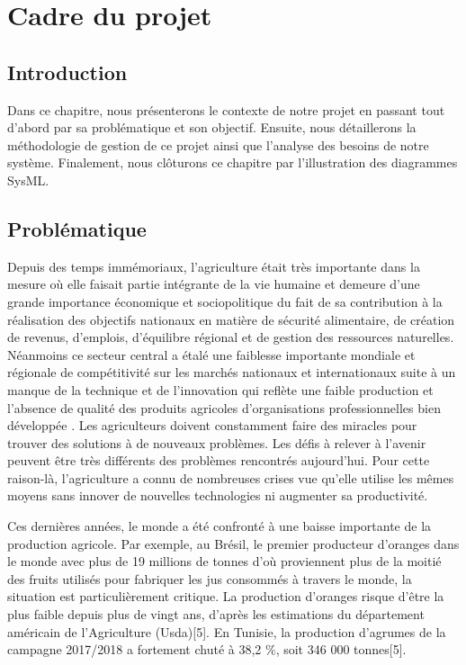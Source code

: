 

	\chapter{Cadre du projet }
	\newpage
	
	
	\section{Introduction }
	Dans ce chapitre, nous présenterons le contexte de notre projet en passant tout d'abord par sa  problématique et son objectif. Ensuite, nous détaillerons la méthodologie de gestion de ce projet ainsi que l'analyse des besoins de notre système. Finalement, nous clôturons ce chapitre par l'illustration des diagrammes SysML.
	
	\section{Problématique }
	Depuis des temps immémoriaux, l'agriculture était très importante dans la mesure où elle faisait partie intégrante de la vie humaine et demeure d'une grande importance économique et sociopolitique du fait de sa contribution à la réalisation des objectifs nationaux en matière de sécurité alimentaire, de création de revenus, d'emplois, d'équilibre régional et de gestion des ressources naturelles. Néanmoins ce secteur central a étalé une faiblesse importante mondiale et régionale de compétitivité sur les marchés nationaux et internationaux suite à un manque de la technique et de l'innovation qui reflète une faible production et l'absence de qualité des produits agricoles d'organisations professionnelles bien développée . Les agriculteurs doivent constamment faire des miracles pour trouver des solutions à de nouveaux problèmes. Les défis à relever à l'avenir peuvent être très différents des problèmes rencontrés aujourd'hui. Pour cette raison-là, l'agriculture a connu de nombreuses crises vue qu'elle utilise les mêmes moyens sans innover de nouvelles technologies ni augmenter sa productivité.
	
	Ces dernières années, le monde a été confronté à une baisse importante de la production agricole. Par exemple, au Brésil, le premier producteur d'oranges dans le monde avec plus de 19 millions de tonnes d'où proviennent plus de la moitié des fruits utilisés pour fabriquer les jus consommés à travers le monde, la situation est particulièrement critique. La production d'oranges risque d'être la plus faible depuis plus de vingt ans, d'après les estimations du département américain de l'Agriculture (Usda)[5]. En Tunisie, la production d'agrumes de la campagne 2017/2018 a fortement chuté à 38,2 \%, soit 346 000 tonnes[5].
	
